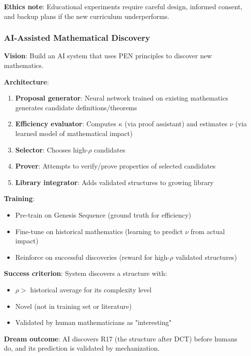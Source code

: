 \documentclass[11pt]{article}
\theoremstyle{definition}
\begin{document}
\textbf{Ethics note}: Educational experiments require careful design, informed consent, and backup plans if the new curriculum underperforms.

\subsubsection{AI-Assisted Mathematical Discovery}

\textbf{Vision}: Build an AI system that uses PEN principles to discover new mathematics.

\textbf{Architecture}:
\begin{enumerate}
\item \textbf{Proposal generator}: Neural network trained on existing mathematics generates candidate definitions/theorems
\item \textbf{Efficiency evaluator}: Computes $\kappa$ (via proof assistant) and estimates $\nu$ (via learned model of mathematical impact)
\item \textbf{Selector}: Chooses high-$\rho$ candidates
\item \textbf{Prover}: Attempts to verify/prove properties of selected candidates
\item \textbf{Library integrator}: Adds validated structures to growing library
\end{enumerate}

\textbf{Training}:
\begin{itemize}
\item Pre-train on Genesis Sequence (ground truth for efficiency)
\item Fine-tune on historical mathematics (learning to predict $\nu$ from actual impact)
\item Reinforce on successful discoveries (reward for high-$\rho$ validated structures)
\end{itemize}

\textbf{Success criterion}: System discovers a structure with:
\begin{itemize}
\item $\rho > $ historical average for its complexity level
\item Novel (not in training set or literature)
\item Validated by human mathematicians as "interesting"
\end{itemize}

\textbf{Dream outcome}: AI discovers R17 (the structure after DCT) before humans do, and its prediction is validated by mechanization.
\end{document}
